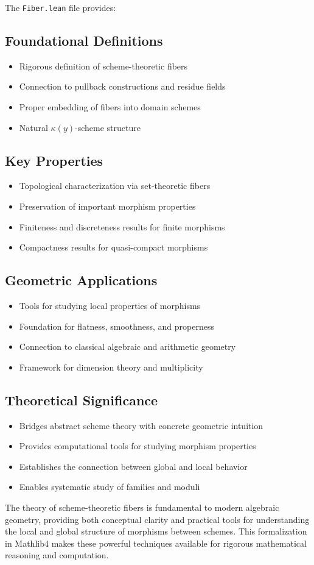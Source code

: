 \documentclass{article}
\theoremstyle{definition}
\begin{document}
The \texttt{Fiber.lean} file provides:

\subsection{Foundational Definitions}
\begin{itemize}
\item Rigorous definition of scheme-theoretic fibers
\item Connection to pullback constructions and residue fields
\item Proper embedding of fibers into domain schemes
\item Natural $\kappa(y)$-scheme structure
\end{itemize}

\subsection{Key Properties}
\begin{itemize}
\item Topological characterization via set-theoretic fibers
\item Preservation of important morphism properties
\item Finiteness and discreteness results for finite morphisms
\item Compactness results for quasi-compact morphisms
\end{itemize}

\subsection{Geometric Applications}
\begin{itemize}
\item Tools for studying local properties of morphisms
\item Foundation for flatness, smoothness, and properness
\item Connection to classical algebraic and arithmetic geometry
\item Framework for dimension theory and multiplicity
\end{itemize}

\subsection{Theoretical Significance}
\begin{itemize}
\item Bridges abstract scheme theory with concrete geometric intuition
\item Provides computational tools for studying morphism properties
\item Establishes the connection between global and local behavior
\item Enables systematic study of families and moduli
\end{itemize}

The theory of scheme-theoretic fibers is fundamental to modern algebraic geometry, providing both conceptual clarity and practical tools for understanding the local and global structure of morphisms between schemes. This formalization in Mathlib4 makes these powerful techniques available for rigorous mathematical reasoning and computation.
\end{document}
